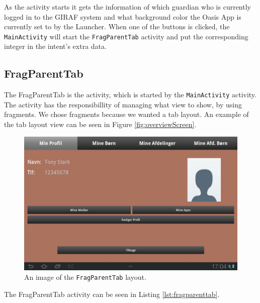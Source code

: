 As the activity starts it gets the information of which guardian who is currently logged in to the GIRAF system and what background color the Oasis App is currently set to by the Launcher.
When one of the buttons is clicked, the \texttt{MainActivity} will start the \texttt{FragParentTab} activity and put the corresponding integer in the intent's extra data.

\subsection{FragParentTab}
The FragParentTab is the activity, which is started by the \texttt{MainActivity} activity.
The activity has the responsibillity of managing what view to show, by using fragments.
We chose fragments because we wanted a tab layout.
An example of the tab layout view can be seen in Figure \vref{fig:overviewScreen}.

\begin{figure}[htbp]
	\centering
		\includegraphics[width=\textwidth]{Images/overviewScreen}
	\caption{An image of the \texttt{FragParentTab} layout.}
	\label{fig:overviewScreen}
\end{figure}

The FragParentTab activity can be seen in Listing \vref{lst:fragparenttab}.

